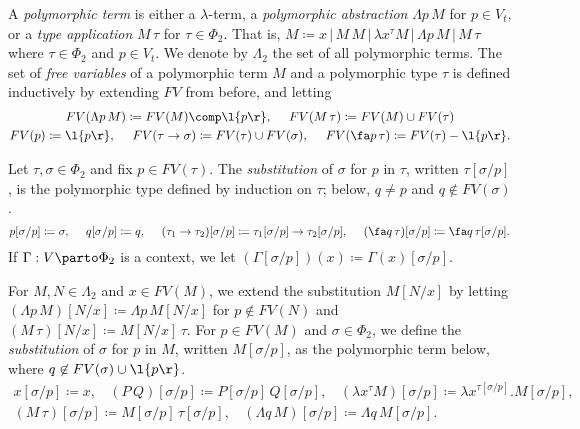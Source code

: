 \documentclass[reqno]{amsart}
\begin{document}
    \begin{definition}
        A \textit{polymorphic term} is either a $\lambda$-term, a \textit{polymorphic abstraction} $\Lambda p\,M$ for $p\in V_t$, or a \textit{type application} $M\,\tau$ for $\tau\in\Phi_2$. That is, $M\coloneqq x\,|\,M\,M\,|\,\lambda x^\tau M\,|\,\Lambda p\,M\,|\,M\,\tau$ where $\tau\in\Phi_2$ and $p\in V_t$. We denote by $\Lambda_2$ the set of all polymorphic terms. The set of \textit{free variables} of a polymorphic term $M$ and a polymorphic type $\tau$ is defined inductively by extending $FV$ from before, and letting
        \begin{equation*}
            \begin{gathered}
                FV(\Lambda p\,M)\coloneqq FV(M)\comp\l\{p\r\},\ \ \ \ FV(M\,\tau)\coloneqq FV(M)\cup FV(\tau) \\
                FV(p)\coloneqq\l\{p\r\},\ \ \ \ FV(\tau\rightarrow\sigma)\coloneqq FV(\tau)\cup FV(\sigma),\ \ \ \ FV(\fa p\,\tau)\coloneqq FV(\tau)-\l\{p\r\}.
            \end{gathered}
        \end{equation*}
    \end{definition}

    \begin{definition}
        Let $\tau,\sigma\in\Phi_2$ and fix $p\in FV(\tau)$. The \textit{substitution} of $\sigma$ for $p$ in $\tau$, written $\tau[\sigma/p]$, is the polymorphic type defined by induction on $\tau$; below, $q\neq p$ and $q\not\in FV(\sigma)$.
        \begin{equation*}
            p[\sigma/p]\coloneqq\sigma,\ \ \ \ q[\sigma/p]\coloneqq q,\ \ \ \ (\tau_1\rightarrow\tau_2)[\sigma/p]\coloneqq\tau_1[\sigma/p]\rightarrow\tau_2[\sigma/p],\ \ \ \ (\fa q\,\tau)[\sigma/p]\coloneqq\fa q\,\tau[\sigma/p].
        \end{equation*}
        If $\Gamma:V\parto\Phi_2$ is a context, we let $(\Gamma[\sigma/p])(x)\coloneqq\Gamma(x)[\sigma/p]$.
    \end{definition}

    \begin{definition}
        For $M,N\in\Lambda_2$ and $x\in FV(M)$, we extend the substitution $M[N/x]$ by letting $(\Lambda p\,M)[N/x]\coloneqq\Lambda p\,M[N/x]$ for $p\not\in FV(N)$ and $(M\,\tau)[N/x]\coloneqq M[N/x]\,\tau$. For $p\in FV(M)$ and $\sigma\in\Phi_2$, we define the \textit{substitution} of $\sigma$ for $p$ in $M$, written $M[\sigma/p]$, as the polymorphic term below, where $q\not\in FV(\sigma)\cup\l\{p\r\}$.
        \begin{equation*}
            \begin{gathered}
                x[\sigma/p]\coloneqq x,\ \ \ \ (P\,Q)[\sigma/p]\coloneqq P[\sigma/p]\,Q[\sigma/p],\ \ \ \ (\lambda x^\tau M)[\sigma/p]\coloneqq\lambda x^{\tau[\sigma/p]}.M[\sigma/p],\\
                (M\,\tau)[\sigma/p]\coloneqq M[\sigma/p]\,\tau[\sigma/p],\ \ \ \ (\Lambda q\,M)[\sigma/p]\coloneqq\Lambda q\,M[\sigma/p].
            \end{gathered}
        \end{equation*}
    \end{definition}
\end{document}
